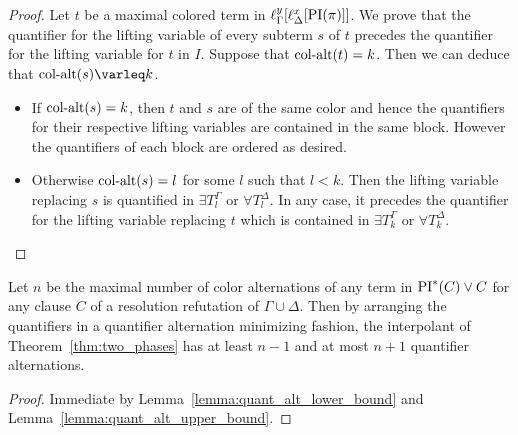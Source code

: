 \documentclass[%
	draft=false,%
	numbers=noendperiod,%
	11pt,%
	a4paper,%
	oneside,%
	openany,%
]{memoir}
\begin{document}
\begin{proof}
	Let $t$ be a maximal colored term in $\ell_{\Gamma}^{y}[\ell_{\Delta}^{x}[\operatorname{PI}(\pi)]]$. 
	We prove that the quantifier for the lifting variable of every subterm $s$ of $t$ precedes the quantifier for the lifting variable for $t$ in $I$.
	Suppose that $\operatorname{col-alt}(t) = k$. Then we can deduce that $\ca(s) \varleq\nolinebreak{} k$.
	\begin{itemize}
		\item
			If $\operatorname{col-alt}(s) = k$, then $t$ and $s$ are of the same color and hence the quantifiers for their respective lifting variables are contained in the same block. 
			However the quantifiers of each block are ordered as desired.
		\item
			Otherwise $\operatorname{col-alt}(s) = l$ for some $l$ such that $l < k$.
			Then the lifting variable replacing $s$ is quantified in
			$\exists T_{l}^\Gamma$ or
			$\forall T_{l}^\Delta$.
			In any case, it precedes the quantifier for the lifting variable replacing $t$ which is contained in 
			$\exists T_{k}^\Gamma$ or
			$\forall T_{k}^\Delta$.
			\qedhere
	\end{itemize}
\end{proof}

\begin{prop}
	Let $n$ be the maximal number of color alternations of any term in $\operatorname{PI}^*(C) \lor C$ for any clause $C$ of a resolution refutation of $\Gamma \cup \Delta$.
	Then by arranging the quantifiers in a quantifier alternation minimizing fashion, the interpolant of Theorem~\ref{thm:two_phases} has at least $n-1$ and at most $n+1$ quantifier alternations.
\end{prop}
\begin{proof}
	Immediate by Lemma~\ref{lemma:quant_alt_lower_bound} and Lemma~\ref{lemma:quant_alt_upper_bound}.
\end{proof}


\begin{comment}
\begin{itemize}
	\item Supp $n = 0$. then no quantifiers
	\item Supp $n = 1$.
		then every term has at most one color. 
		Note that there are no subterm-relations between any two terms of different color.
		Hence
		$\forall x_{.} \quantifierdots \forall x_{.}
		\exists y_{.} \quantifierdots \exists y_{.} \lifboth{\PI(\pi)}$ is a minimal arrangement of quantifiers and has either $\ca(I) = 2$ or $\ca(I) = 1$ if there are only terms of one color.

	\item Supp works for $n$.

		not sure..
\end{itemize}


$ \forall x_{t^{\Delta_1}_1} \dots \forall x_{t^{\Delta_1}_{n_{|\Delta_1|}}} $
\end{comment}
\end{document}
